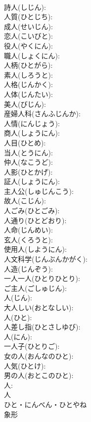 \documentclass[8pt]{extreport}
\begin{document}
\begin{CJK}{UTF8}{min}
\\	詩人(しじん): 
\\	人質(ひとじち): 
\\	成人(せいじん): 
\\	恋人(こいびと): 
\\	役人(やくにん): 
\\	職人(しょくにん): 
\\	人柄(ひとがら): 
\\	素人(しろうと): 
\\	人格(じんかく): 
\\	人体(じんたい): 
\\	美人(びじん): 
\\	産婦人科(さんふじんか): 
\\	人情(にんじょう): 
\\	商人(しょうにん): 
\\	人目(ひとめ): 
\\	当人(とうにん): 
\\	仲人(なこうど): 
\\	人影(ひとかげ): 
\\	証人(しょうにん): 
\\	主人公(しゅじんこう): 
\\	故人(こじん): 
\\	人ごみ(ひとごみ): 
\\	人通り(ひとどおり): 
\\	人命(じんめい): 
\\	玄人(くろうと): 
\\	使用人(しようにん): 
\\	人文科学(じんぶんかがく): 
\\	人造(じんぞう): 
\\	一人一人(ひとりひとり): 
\\	ご主人(ごしゅじん): 
\\	人(じん): 
\\	大人しい(おとなしい): 
\\	人(ひと): 
\\	人差し指(ひとさしゆび): 
\\	人(にん): 
\\	一人子(ひとりご): 
\\	女の人(おんなのひと): 
\\	人気(ひとけ): 
\\	男の人(おとこのひと): 
\\	人: 
\\	人	
\\	ひと・にんべん・ひとやね	
\\	象形 

\end{CJK}
\end{document}
